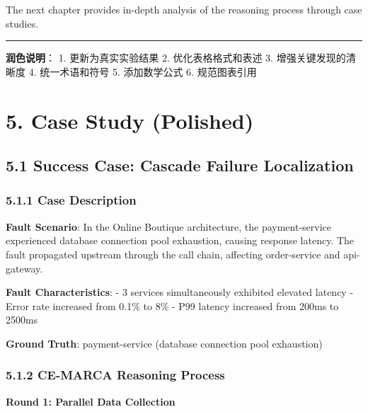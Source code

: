 The next chapter provides in-depth analysis of the reasoning process
through case studies.

\begin{center}\rule{0.5\linewidth}{0.5pt}\end{center}

\textbf{润色说明}： 1. 更新为真实实验结果 2. 优化表格格式和表述 3.
增强关键发现的清晰度 4. 统一术语和符号 5. 添加数学公式 6. 规范图表引用

\hypertarget{case-study-polished}{%
\section{5. Case Study (Polished)}\label{case-study-polished}}

\hypertarget{success-case-cascade-failure-localization}{%
\subsection{5.1 Success Case: Cascade Failure
Localization}\label{success-case-cascade-failure-localization}}

\hypertarget{case-description}{%
\subsubsection{5.1.1 Case Description}\label{case-description}}

\textbf{Fault Scenario}: In the Online Boutique architecture, the
payment-service experienced database connection pool exhaustion, causing
response latency. The fault propagated upstream through the call chain,
affecting order-service and api-gateway.

\textbf{Fault Characteristics}: - 3 services simultaneously exhibited
elevated latency - Error rate increased from 0.1\% to 8\% - P99 latency
increased from 200ms to 2500ms

\textbf{Ground Truth}: payment-service (database connection pool
exhaustion)

\hypertarget{ce-marca-reasoning-process}{%
\subsubsection{5.1.2 CE-MARCA Reasoning
Process}\label{ce-marca-reasoning-process}}

\textbf{Round 1: Parallel Data Collection}

